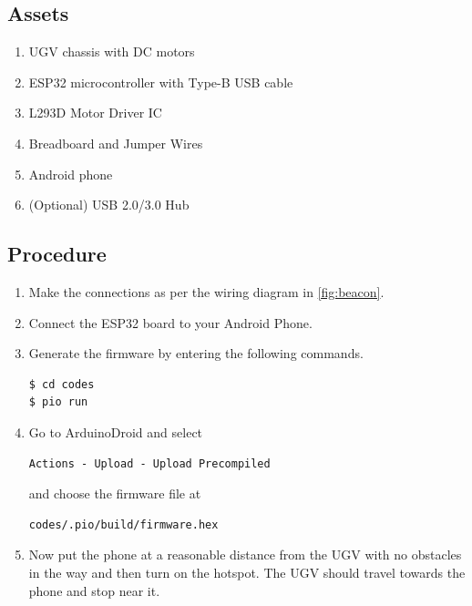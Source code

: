 \documentclass[conference]{IEEEtran}
\begin{document}
\subsection{Assets}
\begin{enumerate}
    \item UGV chassis with DC motors
    \item ESP32 microcontroller with Type-B USB cable
    \item L293D Motor Driver IC
    \item Breadboard and Jumper Wires
    \item Android phone
    \item (Optional) USB 2.0/3.0 Hub
\end{enumerate}

\subsection{Procedure}
\begin{enumerate}
    \item Make the connections as per the wiring diagram in
    \autoref{fig:beacon}.
    \item Connect the ESP32 board to your Android Phone.
    \item Generate the firmware by entering the following commands.
        \begin{lstlisting}
$ cd codes
$ pio run
        \end{lstlisting}
    \item Go to ArduinoDroid and select
        \begin{lstlisting}
Actions - Upload - Upload Precompiled
        \end{lstlisting}
    and choose the firmware file at
        \begin{lstlisting}
codes/.pio/build/firmware.hex
        \end{lstlisting}
    \item Now put the phone at a reasonable distance from the UGV with no
    obstacles in the way and then turn on the hotspot. The UGV should travel
    towards the phone and stop near it.
\end{enumerate}
\end{document}
